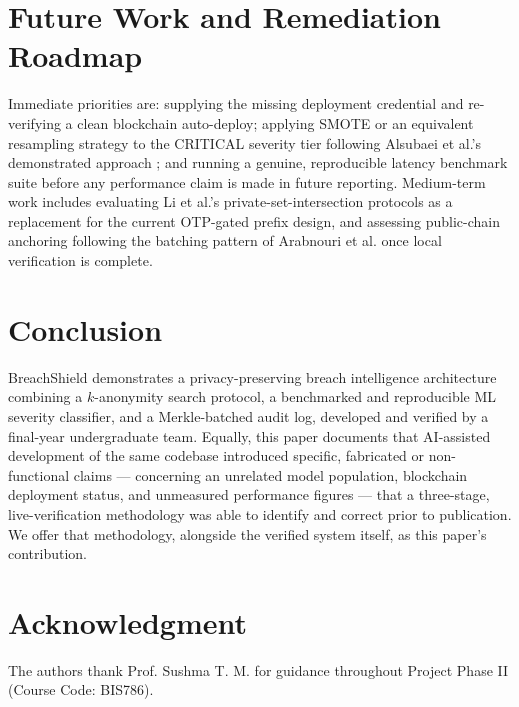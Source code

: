 \documentclass[conference]{IEEEtran}
\begin{document}
\section{Future Work and Remediation Roadmap}
Immediate priorities are: supplying the missing deployment credential and re-verifying a clean blockchain auto-deploy; applying SMOTE or an equivalent resampling strategy to the CRITICAL severity tier following Alsubaei et al.'s demonstrated approach \cite{alsubaei2024enhancing}; and running a genuine, reproducible latency benchmark suite before any performance claim is made in future reporting. Medium-term work includes evaluating Li et al.'s private-set-intersection protocols \cite{li2019protocols} as a replacement for the current OTP-gated prefix design, and assessing public-chain anchoring following the batching pattern of Arabnouri et al. \cite{arabnouri2024secure} once local verification is complete.

\section{Conclusion}
BreachShield demonstrates a privacy-preserving breach intelligence architecture combining a $k$-anonymity search protocol, a benchmarked and reproducible ML severity classifier, and a Merkle-batched audit log, developed and verified by a final-year undergraduate team. Equally, this paper documents that AI-assisted development of the same codebase introduced specific, fabricated or non-functional claims --- concerning an unrelated model population, blockchain deployment status, and unmeasured performance figures --- that a three-stage, live-verification methodology was able to identify and correct prior to publication. We offer that methodology, alongside the verified system itself, as this paper's contribution.

\section*{Acknowledgment}
The authors thank Prof. Sushma T. M. for guidance throughout Project Phase II (Course Code: BIS786).



\end{document}
